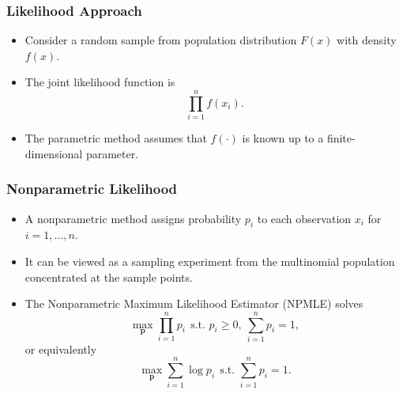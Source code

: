 \documentclass{beamer}
\begin{document}
\begin{frame}
\frametitle{Likelihood Approach}
\begin{itemize}
\item Consider a random sample from population distribution $F(x)$ with density
$f(x)$. 
\item The joint likelihood function is \begin{displaymath}
\prod_{i=1}^n f(x_i).
\end{displaymath}
\item The parametric method assumes that $f(\cdot)$ is known up to a finite-dimensional
parameter. 
\end{itemize}
\end{frame}






\begin{frame}
\frametitle{Nonparametric Likelihood}
\begin{itemize}
\item A nonparametric method assigns probability \(p_i\) to each observation
\(x_i\) for \(i=1,\ldots,n\). 

\item It can be viewed as a sampling experiment from
the multinomial population concentrated at the sample points. \pause

\item 
The Nonparametric Maximum Likelihood Estimator (NPMLE) solves
\begin{displaymath}
\max_{\mathbf{p}} \prod_{i=1}^n p_i \ \ \mbox{s.t. } p_i \geq 0, \  \sum_{i=1}^n p_i = 1,
\end{displaymath} or equivalently
\begin{displaymath}
\max_{\mathbf{p}} \sum_{i=1}^n \log p_i \ \ \mbox{s.t. }   \sum_{i=1}^n
p_i = 1.
\end{displaymath}
\end{itemize}
\end{frame}
\end{document}
